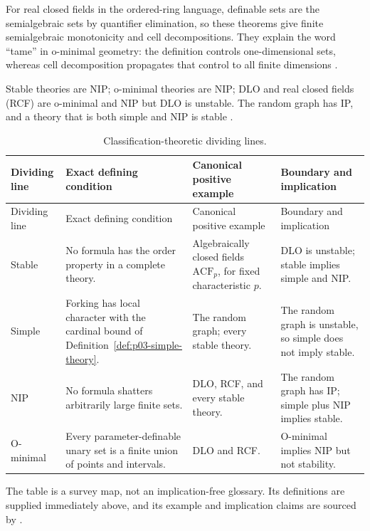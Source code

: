 For real closed fields in the ordered-ring language, definable sets are the
semialgebraic sets by quantifier elimination, so these theorems give finite
semialgebraic monotonicity and cell decompositions.  They explain the word
``tame'' in o-minimal geometry: the definition controls one-dimensional sets,
whereas cell decomposition propagates that control to all finite dimensions
\cite{PillaySteinhorn1986,VanDenDries1998,Marker2002}.

Stable theories are NIP; o-minimal theories are NIP; DLO and real closed
fields (RCF) are o-minimal and NIP but DLO is unstable.  The random graph has IP,
and a theory that is both simple and NIP is stable
\cite{Simon2015,VanDenDries1998,PillaySteinhorn1986,TentZiegler2012}.

\begingroup\small
\setlength{\tabcolsep}{4pt}
\begin{longtable}{@{}p{}p{}p{}p{}@{}}
\caption{Classification-theoretic dividing lines.}
\label{tab:p03-classification-overview}\\
\toprule
Dividing line & Exact defining condition & Canonical positive example &
Boundary and implication \\
\midrule
\endfirsthead
\toprule
Dividing line & Exact defining condition & Canonical positive example &
Boundary and implication \\
\midrule
\endhead
Stable & No formula has the order property in a complete theory. &
Algebraically closed fields \(\mathrm{ACF}_p\), for fixed characteristic \(p\). &
DLO is unstable; stable implies simple and NIP. \\
\addlinespace
Simple & Forking has local character with the cardinal bound of
Definition~\ref{def:p03-simple-theory}. &
The random graph; every stable theory. &
The random graph is unstable, so simple does not imply stable. \\
\addlinespace
NIP & No formula shatters arbitrarily large finite sets. &
DLO, RCF, and every stable theory. &
The random graph has IP; simple plus NIP implies stable. \\
\addlinespace
O-minimal & Every parameter-definable unary set is a finite union of points
and intervals. &
DLO and RCF. &
O-minimal implies NIP but not stability. \\
\bottomrule
\end{longtable}
\endgroup

The table is a survey map, not an implication-free glossary.  Its definitions
are supplied immediately above, and its example and implication claims are
sourced by \cite{Shelah1971Stability,TentZiegler2012,Kim1998,Simon2015,
VanDenDries1998,PillaySteinhorn1986}.
